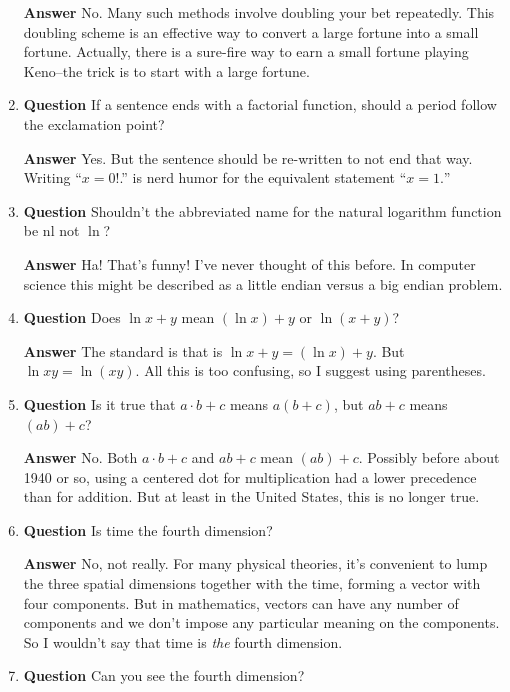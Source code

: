 \documentclass[11pt]{article}
\newcounter{ex}\setcounter{ex}{0}
\newcounter{cd}\setcounter{cd}{24}
\begin{document}
\begin{enumerate}
 \textbf{Answer} No. Many such methods involve doubling your bet repeatedly. This doubling scheme is 
an effective way to convert  a large fortune into a small fortune. Actually, there is a sure-fire 
way to earn a small fortune playing Keno--the trick is to start with a 
large fortune.

\item  \textbf{Question}  If a sentence ends with a factorial function, should a period 
follow the exclamation point?

  \textbf{Answer}  Yes. But the sentence should be re-written to not 
  end that way.  Writing ``\(x = 0!\).''  is nerd humor for the 
  equivalent statement ``\(x = 1.\)''
\
\item \textbf{Question}   Shouldn't the abbreviated name for the natural logarithm function be $\mathrm{nl}$
      not $\ln$?
      
\textbf{Answer} Ha! That's funny! I've never thought of this before. In computer science
  this might be described as a  little endian versus a big endian problem.

\item  \textbf{Question} Does \(\ln x + y\) mean \((\ln x) + y \) or   \(\ln  (x + y)\)?

 \textbf{Answer} The standard is that is \(\ln x + y = (\ln x) + y \). But \( \ln x y = \ln(xy)\).  All this is too confusing, so I suggest using parentheses. 

\item  \textbf{Question}  Is it true that \(a \cdot b  + c\) means \(a (b+c)\), but \(a  b  + c\) means \((ab) + c\)?

 \textbf{Answer} No.  Both  \(a \cdot b  + c\) and \(a b + c\) mean  \((ab) + c\).  Possibly before about 1940 or so, using a centered dot for multiplication had a lower precedence than for addition. But at least in the United States, this is no longer true.



\item  \textbf{Question}  Is time the fourth dimension?

\textbf{Answer} No, not really.  For many physical theories, it's convenient to lump the three spatial dimensions together with the time, forming a vector with four components. But in mathematics, 
vectors can have any number of components and we don't impose any particular meaning on the components. So I wouldn't say that time is \emph{the} fourth dimension.

\item  \textbf{Question}  Can you see the fourth dimension?


\end{enumerate}
\end{document}
